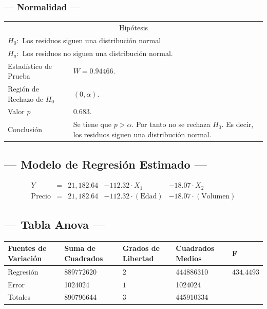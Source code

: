 \subsubsection{--- Normalidad ---} %
\begin{center}
  \begin{tabular}{|l|p{8cm}|}
    \cline{1-2}
    \multicolumn{2}{|c|}{Hipótesis}\\ \cline{1-2}
    \multicolumn{2}{|l|}{\(H_0:\) Los residuos siguen una distribución normal} \\ 
    \multicolumn{2}{|l|}{\(H_a:\) Los residuos no siguen una distribución normal.} \\ \cline{1-2}
    Estadístico de Prueba & \(W = 0.94466\).\\ \cline{1-2} 
		Región de Rechazo de \(H_0\) & \((0, \alpha )\).\\ \cline{1-2} 
    Valor \(p\) & \(0.683\).\\ \cline{1-2} 
    Conclusión & Se tiene que \(p> \alpha\). \newline 
		Por tanto no se rechaza \(H_0\). \newline 
		Es decir, los residuos siguen una distribución normal.\\ \cline{1-2} 
  \end{tabular}
\end{center}


\subsection{\centering --- Modelo de Regresión Estimado ---} %
\begin{align}
	Y & = &  21,182.64  & -112.32 \cdot X_1     & -18.07 \cdot X_2   \\[2mm]
	\mbox{Precio} & = &  21,182.64 & - 112.32 \cdot (\mbox{Edad}) & - 18.07 \cdot (\mbox{Volumen})
	\label{eq:1}
\end{align}

\subsection{\centering --- Tabla Anova ---} %
\begin{center}
  \begin{tabular}{|l|l|l|l|l|}
    \hline 
    Fuentes de Variación  & Suma de Cuadrados & Grados de Libertad & Cuadrados Medios & F\\ \hline 
    Regresión           & 889772620 &           \(2\) & 444886310 & \(434.4493\) \\ \hline 
    Error               &   1024024 &          \(1\)  &   1024024 &   \\ \hline 
    Totales             & 890796644 &          \(3\)  & 445910334 &   \\ \hline 
  \end{tabular}
\end{center} 

